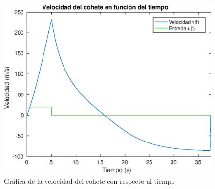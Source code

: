 \documentclass[12pt,letterpaper]{article}
\begin{document}
\begin{figure}[ht!]
  \centering
  \includegraphics[width=0.5\linewidth]{pictures/Ejercicio3/velocidad_cohete_vs_tiempo.eps}
  \caption{Gráfica de la velocidad del cohete con respecto al tiempo}
  \label{fig:vel_cohete}
\end{figure}
\end{document}
